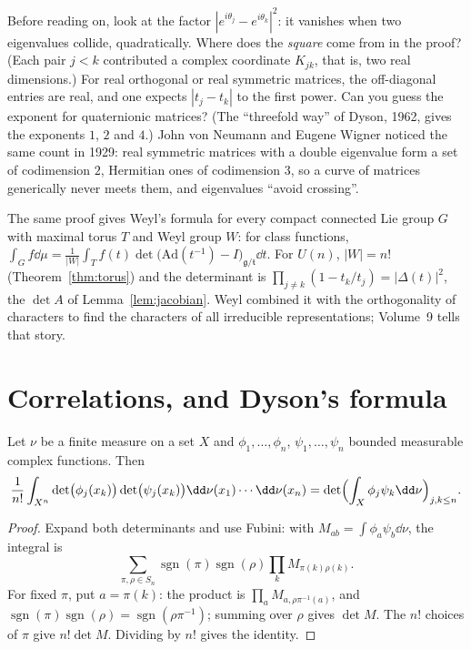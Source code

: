 \begin{think}
Before reading on, look at the factor $|e^{i\theta_j}-e^{i\theta_k}|^2$: it vanishes when two eigenvalues collide, quadratically. Where does the \emph{square} come from in the proof? (Each pair $j<k$ contributed a complex
coordinate $K_{jk}$, that is, two real dimensions.) For real orthogonal or real symmetric matrices, the off-diagonal entries are real, and one expects $|t_j-t_k|$ to the first power. Can you
guess the exponent for quaternionic matrices? (The ``threefold way'' of Dyson, 1962, gives the exponents $1$, $2$ and $4$.) John von Neumann and Eugene Wigner noticed the same count in 1929: real
symmetric matrices with a double eigenvalue form a set of codimension $2$, Hermitian ones of codimension $3$, so a curve of matrices generically never meets them, and eigenvalues ``avoid crossing''.
\end{think}

\begin{remark}
The same proof gives Weyl's formula for every compact connected Lie group $G$ with maximal torus $T$ and Weyl group $W$: for class functions, $\int_Gf\dd\mu=\frac1{|W|}\int_Tf(t)\det\bigl(\mathrm{Ad}(t^{-1})-I\bigr)_{\mathfrak g/\mathfrak t}\dd t$.
For $U(n)$, $|W|=n!$ (Theorem~\ref{thm:torus}) and the determinant is $\prod_{j\neq k}(1-t_k/t_j)=|\Delta(t)|^2$, the $\det A$ of Lemma~\ref{lem:jacobian}. Weyl combined it with the orthogonality of characters to
find the characters of all irreducible representations; Volume~9 tells that story.
\end{remark}

\section{Correlations, and Dyson's formula}

\begin{lemma}[Andreief, 1883]\label{lem:andreief}
Let $\nu$ be a finite measure on a set $X$ and $\phi_1,\dots,\phi_n$, $\psi_1,\dots,\psi_n$ bounded measurable complex functions. Then
\[\frac1{n!}\int_{X^n}\det\bigl(\phi_j(x_k)\bigr)\det\bigl(\psi_j(x_k)\bigr)\dd\nu(x_1)\cdots\dd\nu(x_n)=\det\Bigl(\int_X\phi_j\psi_k\dd\nu\Bigr)_{j,k\le n}.\]
\end{lemma}

\begin{proof}
Expand both determinants and use Fubini: with $M_{ab}=\int\phi_a\psi_b\dd\nu$, the integral is
\[\sum_{\pi,\rho\in S_n}\operatorname{sgn}(\pi)\operatorname{sgn}(\rho)\prod_kM_{\pi(k)\rho(k)}.\] For fixed $\pi$, put $a=\pi(k)$: the product is $\prod_aM_{a,\rho\pi^{-1}(a)}$,
and $\operatorname{sgn}(\pi)\operatorname{sgn}(\rho)=\operatorname{sgn}(\rho\pi^{-1})$; summing over $\rho$ gives $\det M$. The $n!$ choices of $\pi$ give $n!\det M$. Dividing by $n!$ gives the identity.
\end{proof}

